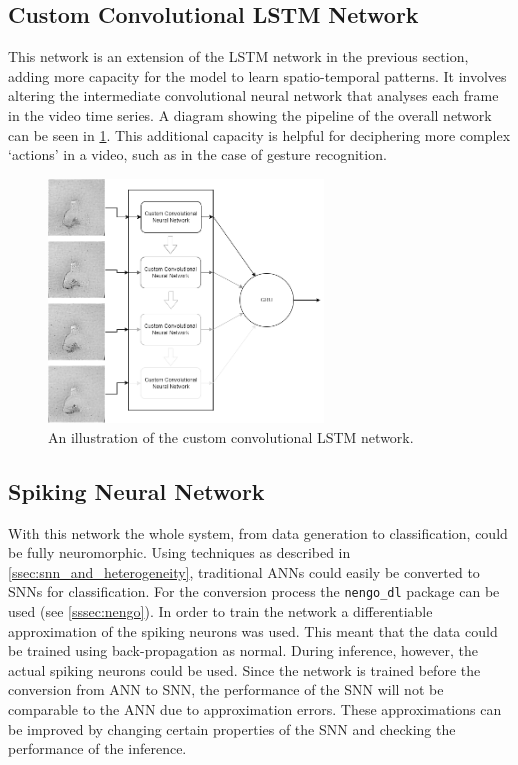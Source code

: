 \subsection{Custom Convolutional LSTM Network}

This network is an extension of the LSTM network in the previous section, adding more capacity for the model to learn spatio-temporal patterns. It involves altering the intermediate convolutional neural network that analyses each frame in the video time series. A diagram showing the pipeline of the overall network can be seen in \cref{fig:custom_conv_lstm_pipeline}. This additional capacity is helpful for deciphering more complex `actions' in a video, such as in the case of gesture recognition.

\begin{figure}[htb]
    \centering
    \includegraphics[width=0.65\textwidth]{analysisanddesign/images/custom_conv_lstm_pipeline.png}
    \caption{An illustration of the custom convolutional LSTM network.}
    \label{fig:custom_conv_lstm_pipeline}
\end{figure}

\subsection{Spiking Neural Network} \label{ssec:snn_design}

With this network the whole system, from data generation to classification, could be fully neuromorphic. Using techniques as described in \cref{ssec:snn_and_heterogeneity}, traditional ANNs could easily be converted to SNNs\cite{Ann2Snn} for classification. For the conversion process the \lstinline{nengo_dl} package can be used (see \cref{sssec:nengo}). In order to train the network a differentiable approximation of the spiking neurons was used. This meant that the data could be trained using back-propagation as normal. During inference, however, the actual spiking neurons could be used\cite{TrainingSnn}. Since the network is trained before the conversion from ANN to SNN, the performance of the SNN will not be comparable to the ANN due to approximation errors. These approximations can be improved by changing certain properties of the SNN and checking the performance of the inference.

